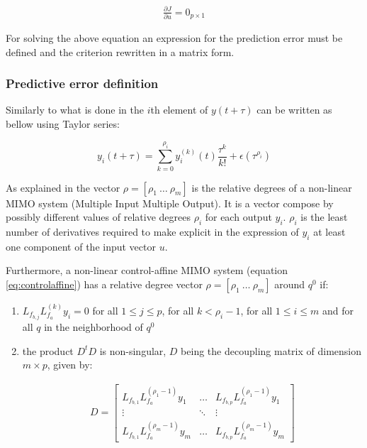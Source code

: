 \documentclass[letterpaper, 10 pt, conference]{ieeeconf}  %
\begin{document}
\begin{align*}
\frac{\partial J}{\partial u} = 0_{p\times 1}
\end{align*}

For solving the above equation an expression for the prediction error must be defined and the criterion rewritten in a matrix form.


\subsubsection{Predictive error definition}

\mbox{}

Similarly to what is done in \cite{Krid2016} the $i$th element of ${y(t+\tau)}$ can be written as bellow using Taylor series:

\begin{equation*}
y_i(t+\tau) = \sum_{k=0}^{\rho_i} 
y^{(k)}_i(t)\frac{\tau^k}{k!} + \epsilon(\tau^{\rho_i})
\end{equation*}

As explained in \cite{Krid2016} the vector $\rho = [\rho_1\ \dots\ \rho_m]$ is the relative degrees of a non-linear MIMO system (Multiple Input Multiple Output). It is a vector compose by possibly different values of relative degrees $\rho_i$ for each output $y_i$. $\rho_i$ is the least number of derivatives required to make explicit in the expression of $y_i$ at least one component of the input vector $u$.

Furthermore, a non-linear control-affine MIMO system (equation \ref{eq:controlaffine}) has a relative degree vector $\rho = [\rho_1\ \dots\ \rho_m]$ around $q^0$ if:

\begin{enumerate}
\item\label{it:cond1} $L_{f_{b,j}}L_{f_a}^{(k)}y_i = 0$ for all $1 \leq j \leq p$, for all $k < \rho_i-1$, for all $1 \leq i \leq m$ and for all $q$ in the neighborhood of $q^0$
\item\label{it:cond2} the product $D^tD$ is non-singular, $D$ being the decoupling matrix of dimension $m \times p$, given by:

\begin{eqnarray}
D = 
\left[\begin{array}{ccc}
L_{f_{b,1}}L_{f_a}^{(\rho_1-1)}y_1 & \dots & L_{f_{b,p}}L_{f_a}^{(\rho_1-1)}y_1\\
\vdots & \ddots & \vdots\\
L_{f_{b,1}}L_{f_a}^{(\rho_m-1)}y_m & \dots & L_{f_{b,p}}L_{f_a}^{(\rho_m-1)}y_m
\end{array}\right]
\end{eqnarray}

\end{enumerate}
\end{document}
